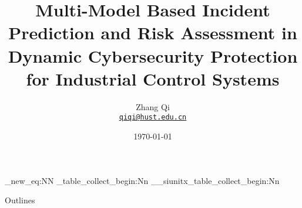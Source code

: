 \usepackage{Theme/BeamerTheme}
\usepackage{mathrsfs}
\usepackage{amsmath}
\usepackage{bm}
\usepackage{mathtools}
\usepackage{booktabs}
\usepackage{ragged2e}
\justifying
\let\raggedright\justifying
\usepackage{tikz}
\usepackage{tkz-euclide}
\usetikzlibrary{decorations.text}
\usetikzlibrary{shadows}
\usetikzlibrary{shapes}
\usetikzlibrary{circuits.logic.CDH}
\usetikzlibrary{arrows.meta}
\usetikzlibrary{decorations.pathmorphing}
\usepackage{pgfplots}


\usepackage{tabu}
\usepackage{graphicx}
\usepackage{colortbl}

\usepackage{siunitx}
\ExplSyntaxOn
\cs_new_eq:NN \siunitx_table_collect_begin:Nn \__siunitx_table_collect_begin:Nn
\ExplSyntaxOff

\usepackage{soul}


\newcommand{\pgfdefaultlinewidth}{0.75pt}

\title{Multi-Model Based Incident Prediction and Risk Assessment in Dynamic Cybersecurity Protection for Industrial Control Systems}
\subtitle{}
\date{\today}
\author[Zhang Qi] %
{
  Zhang Qi\\
  \href{mailto:qiqi@hust.edu.cn}{{\tt qiqi@hust.edu.cn}}
}

\newcommand{\risk}{\mathscr{R}}




\maketitle

\begin{frame}[noframenumbering]{Outlines}\label{Outlines}
    \scriptsize
    \tableofcontents %
\end{frame}








